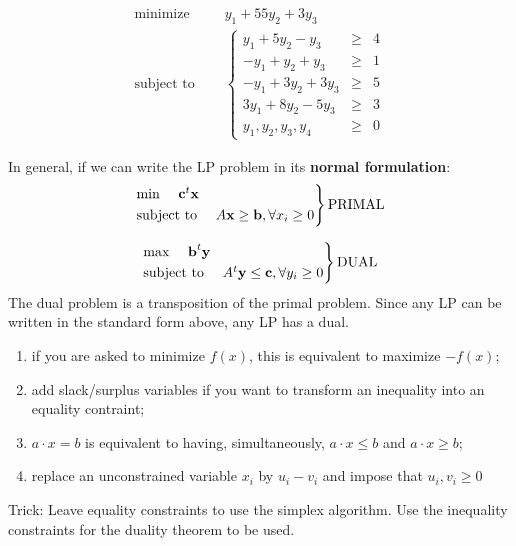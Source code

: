     \begin{equation*}
    \begin{aligned}
      \text{minimize } \quad & y_1+55y_2+3y_3 \\
      \text{subject to }\quad &
      \left\{
      \begin{array}{rcl}
        y_1 + 5y_2 -y_3 &\geq &4 \\
        -y_1 +y_2 +y_3 &\geq &1 \\
        -y_1 +3y_2 +3y_3 &\geq &5 \\
        3y_1 +8y_2 -5y_3 &\geq &3 \\
        y_1,y_2,y_3,y_4 &\geq& 0
      \end{array}
      \right.
    \end{aligned}
  \end{equation*}



In general, if we can write the LP problem in its {\bf normal formulation}:
\[
\begin{rcases}
\text{min }\quad\textbf{c}^t \textbf{x}\\
\text{subject to }\quad A\textbf{x}\geq \textbf{b}, \forall x_i\geq0
\end{rcases} \text{PRIMAL}
\]

\[
\begin{rcases}
\text{max }\quad\textbf{b}^t \textbf{y}\\
\text{subject to }\quad A^t\textbf{y}\leq \textbf{c}, \forall y_i\geq0
\end{rcases} \text{DUAL}
\]
The dual problem is a transposition of the primal problem. Since any LP can be written in the standard form
above, any LP has a dual.

  \begin{enumerate}
    \item if you are asked to minimize $f(x)$, this is equivalent to maximize $-f(x)$;
    \item add slack/surplus variables if you want to transform an inequality into an equality contraint;
    \item $a\cdot x=b$ is equivalent to having, simultaneously, $a \cdot x \leq b$ and $a \cdot x \geq b$;
    \item replace an unconstrained variable $x_i$ by $u_i-v_i$ and impose that $u_i,v_i \geq 0$
  \end{enumerate}
  Trick: Leave equality constraints to use the simplex algorithm. Use the inequality constraints for the duality theorem to be used.


